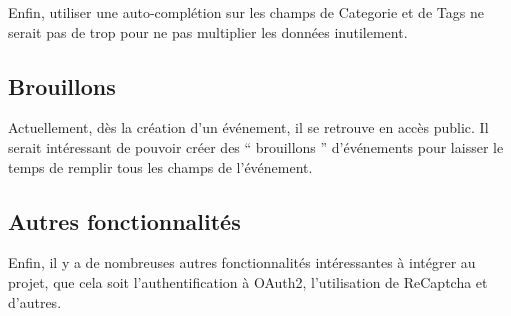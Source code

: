 Enfin, utiliser une auto-complétion sur les champs de Categorie et de Tags ne serait pas de trop pour ne pas multiplier les données inutilement.

\subsection{Brouillons}

Actuellement, dès la création d'un événement, il se retrouve en accès public. Il serait intéressant de pouvoir créer des `` brouillons '' d'événements pour laisser le temps de remplir tous les champs de l'événement.

\subsection{Autres fonctionnalités}

Enfin, il y a de nombreuses autres fonctionnalités intéressantes à intégrer au projet, que cela soit l'authentification à OAuth2, l'utilisation de ReCaptcha et d'autres.